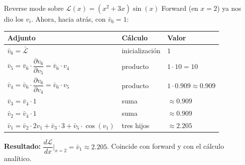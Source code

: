 \documentclass[aspectratio=169,10pt]{beamer}
\begin{document}
\begin{frame}{Reverse mode sobre $\mathcal{L}(x) = (x^2+3x)\sin(x)$}
\vspace{4pt}
Forward (en $x=2$) ya nos dio los $v_i$. Ahora, hacia atrás, con $\bar{v}_6 = 1$:

\vspace{4pt}
\begin{center}
\small
\begin{tabular}{ll l}
\toprule
\textbf{Adjunto} & \textbf{Cálculo} & \textbf{Valor} \\
\midrule
$\bar{v}_6 = \bar{\mathcal{L}}$ & inicialización & $1$ \\
$\bar{v}_5 = \bar{v}_6 \cdot \dfrac{\partial v_6}{\partial v_5} = \bar{v}_6 \cdot v_4$ & producto & $1 \cdot 10 = 10$ \\
$\bar{v}_4 = \bar{v}_6 \cdot \dfrac{\partial v_6}{\partial v_4} = \bar{v}_6 \cdot v_5$ & producto & $1 \cdot 0.909 \approx 0.909$ \\
$\bar{v}_3 = \bar{v}_4 \cdot 1$ & suma & $\approx 0.909$ \\
$\bar{v}_2 = \bar{v}_4 \cdot 1$ & suma & $\approx 0.909$ \\
$\bar{v}_1 = \bar{v}_2 \cdot 2 v_1 + \bar{v}_3 \cdot 3 + \bar{v}_5 \cdot \cos(v_1)$ & tres hijos & $\approx 2.205$ \\
\bottomrule
\end{tabular}
\end{center}

\vspace{6pt}
\textbf{Resultado:} $\dfrac{d\mathcal{L}}{dx}\bigg|_{x=2} = \bar{v}_1 \approx 2.205$. \quad \textcolor{accentteal}{Coincide con forward y con el cálculo analítico.}
\end{frame}
\end{document}
